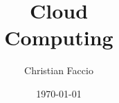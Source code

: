 \documentclass[a4paper,12pt]{report}
\institute{UniTs - University of Trieste}
\title{Cloud\\Computing}
\author{Christian Faccio}
\date{\today}
\begin{document}
\maketitle



\toc

% 

\printbibliography
\end{document}
